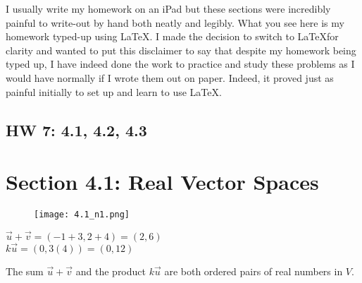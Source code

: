 \documentclass[addpoints]{exam}
\begin{document}
\begin{tcolorbox}[colback=white!5!white,colframe=gray!75!black,title=Disclaimer to Prof. Steever]
  I usually write my homework on an iPad but these sections were incredibly painful to write-out by hand both neatly and legibly. What you see here is my homework typed-up using \LaTeX. I made the decision to switch to \LaTeX \space for clarity and wanted to put this disclaimer to say that despite my homework being typed up, I have indeed done the work to practice and study these problems as I would have normally if I wrote them out on paper. Indeed, it proved just as painful initially to set up and learn to use \LaTeX.
\end{tcolorbox}

\begin{center}
 \section*{HW 7: 4.1, 4.2, 4.3}
\end{center}

\section*{Section 4.1: Real Vector Spaces}


\begin{figure}[h]
    \texttt{[image: 4.1\_n1.png]}
\end{figure}
\begin{tcolorbox}[colback=cyan!5!white,colframe=cyan!75!black,title=1. a) Solution]
   $\vec{u}+\vec{v} = (-1+3, 2+4) = (2, 6) $ \\
   $k \vec{u} = (0, 3(4)) = (0, 12)$ 
\end{tcolorbox}

\begin{tcolorbox}[colback=cyan!5!white,colframe=cyan!75!black,title=1. b) Solution]
The sum $\vec{u}+\vec{v}$ and the product $k\vec{u}$ are both ordered pairs of real numbers in $V$.
\end{tcolorbox}
\end{document}
